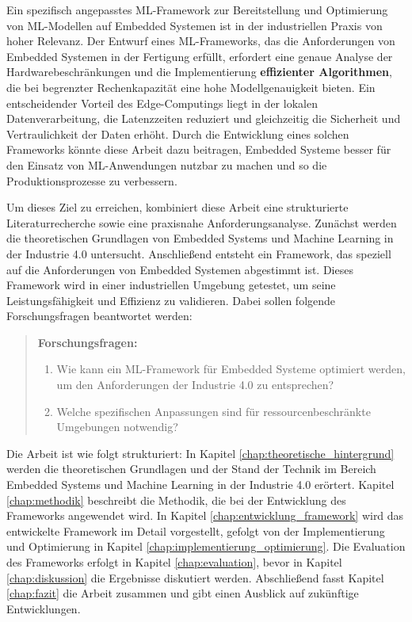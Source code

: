 Ein spezifisch angepasstes ML-Framework zur Bereitstellung und Optimierung von ML-Modellen auf Embedded Systemen 
ist in der industriellen Praxis von hoher Relevanz. Der Entwurf eines ML-Frameworks, das die Anforderungen von 
Embedded Systemen in der Fertigung erfüllt, erfordert eine genaue Analyse der Hardwarebeschränkungen und die 
Implementierung \textbf{effizienter Algorithmen}, die bei begrenzter Rechenkapazität eine hohe Modellgenauigkeit bieten. 
Ein entscheidender Vorteil des Edge-Computings liegt in der lokalen Datenverarbeitung, die Latenzzeiten reduziert 
und gleichzeitig die Sicherheit und Vertraulichkeit der Daten erhöht. Durch die Entwicklung eines solchen 
Frameworks könnte diese Arbeit dazu beitragen, Embedded Systeme besser für den Einsatz von ML-Anwendungen nutzbar 
zu machen und so die Produktionsprozesse zu verbessern.

Um dieses Ziel zu erreichen, kombiniert diese Arbeit eine strukturierte Literaturrecherche sowie eine 
praxisnahe Anforderungsanalyse. Zunächst werden die theoretischen Grundlagen von Embedded Systems und 
Machine Learning in der Industrie 4.0 untersucht. Anschließend entsteht ein Framework, das speziell auf 
die Anforderungen von Embedded Systemen abgestimmt ist. Dieses Framework wird in einer industriellen 
Umgebung getestet, um seine Leistungsfähigkeit und Effizienz zu validieren. Dabei sollen folgende 
Forschungsfragen beantwortet werden: 

\begin{quote}
    \textbf{Forschungsfragen:}
    \begin{enumerate}
        \item Wie kann ein ML-Framework für Embedded Systeme optimiert werden, um den Anforderungen der Industrie 4.0 zu entsprechen?
        \item Welche spezifischen Anpassungen sind für ressourcenbeschränkte Umgebungen notwendig?
    \end{enumerate}
\end{quote}

Die Arbeit ist wie folgt strukturiert: In Kapitel \ref{chap:theoretische_hintergrund} werden die 
theoretischen Grundlagen und der Stand der Technik im Bereich Embedded Systems und Machine Learning 
in der Industrie 4.0 erörtert. Kapitel \ref{chap:methodik} beschreibt die Methodik, die bei der 
Entwicklung des Frameworks angewendet wird. In Kapitel \ref{chap:entwicklung_framework} wird das 
entwickelte Framework im Detail vorgestellt, gefolgt von der Implementierung und Optimierung in 
Kapitel \ref{chap:implementierung_optimierung}. Die Evaluation des Frameworks erfolgt in Kapitel 
\ref{chap:evaluation}, bevor in Kapitel \ref{chap:diskussion} die Ergebnisse diskutiert werden. 
Abschließend fasst Kapitel \ref{chap:fazit} die Arbeit zusammen und gibt einen Ausblick auf 
zukünftige Entwicklungen.
